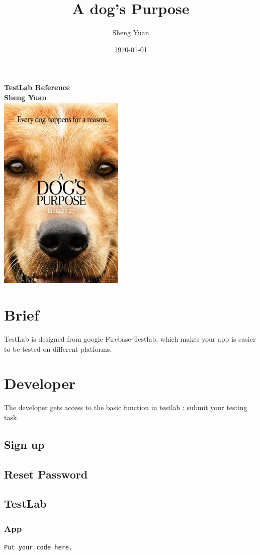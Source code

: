 \documentclass{paper}
\title{A dog's Purpose}
\author{Sheng Yuan}
\date{\today}
\begin{document}
\begin{titlepage}
	\centering
	\vfill
	{\bfseries\Huge
		TestLab Reference\\
		\vskip2cm
		\Large
		Sheng Yuan\\
	}
	\vfill
	\includegraphics[width=6cm]{poster.jpg} %
	\vfill
	\vfill
\end{titlepage}

\tableofcontents

\section{Brief}
	TestLab is designed from google Firebase-Testlab, which makes your app is easier to be tested on different platforms. 
	
\section{Developer}
The developer gets access to the basic function in testlab : submit your testing task.
\subsection{Sign up}
\subsection{Reset Password}
\subsection{TestLab}

\subsubsection{App}
\begin{lstlisting}
Put your code here.
\end{lstlisting}
\end{document}
